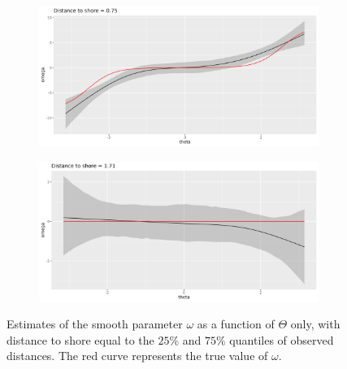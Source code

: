 \documentclass[11pt]{article}
\newcommand {\1}{\mathbb{1}}
\theoremstyle{definition}
\theoremstyle{remark}
\theoremstyle{remark}
\begin{document}
\begin{figure}[H]
	\centering
	\begin{subfigure}{0.48\textwidth}
		\centering
		\includegraphics[scale=0.3]{images/simulation study/fe_crcvm_fjords_hf_ne1_omega_theta_q4_ExpShore .png}
		\caption{}
	\end{subfigure}
	\begin{subfigure}{0.48\textwidth}
		\centering
		\includegraphics[scale=0.3]{images/simulation study/fe_crcvm_fjords_hf_ne1_omega_theta_q2_ExpShore .png}
		\caption{}
	\end{subfigure}
	\caption{Estimates of the smooth parameter $\omega$ as a function of $\Theta$ only, with distance to shore equal to the $25\%$ and $75\%$ quantiles of observed distances. The red curve represents the true value of $\omega$.}
	\label{fig: marginal_estimates_CRCVM}
\end{figure}
\end{document}
